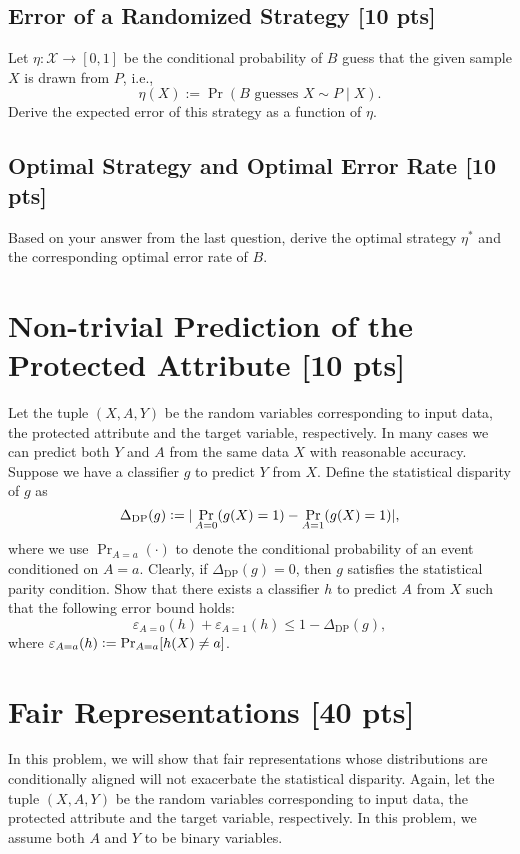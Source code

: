 \documentclass[letterpaper,11pt]{article}
\theoremstyle{definition}
\newcommand{\defeq}{\vcentcolon=}
\begin{document}
	\subsection{Error of a Randomized Strategy [10 pts]}
	Let $\eta:\mathcal{X}\to [0,1]$ be the conditional probability of $B$ guess that the given sample $X$ is drawn from $P$, i.e., 
	\begin{equation*}
		\eta(X) := \Pr(B\text{ guesses }X\sim P\mid X).
	\end{equation*}
	Derive the expected error of this strategy as a function of $\eta$.
	
	\subsection{Optimal Strategy and Optimal Error Rate [10 pts]}
	Based on your answer from the last question, derive the optimal strategy $\eta^*$ and the corresponding optimal error rate of $B$.
	
	\section{Non-trivial Prediction of the Protected Attribute [10 pts]}
	Let the tuple $(X, A, Y)$ be the random variables corresponding to input data, the protected attribute and the target variable, respectively. In many cases we can predict both $Y$ and $A$ from the same data $X$ with reasonable accuracy. Suppose we have a classifier $g$ to predict $Y$ from $X$. Define the statistical disparity of $g$ as
	\begin{equation*}
		\Delta_{\text{DP}}(g)\defeq |\Pr_{A = 0}(g(X) = 1) - \Pr_{A=1}(g(X) = 1)|,
	\end{equation*}
	where we use $\Pr_{A=a}(\cdot)$ to denote the conditional probability of an event conditioned on $A = a$. Clearly, if $\Delta_{\text{DP}}(g) = 0$, then $g$ satisfies the statistical parity condition. Show that there exists a classifier $h$ to predict $A$ from $X$ such that the following error bound holds:
	\begin{equation*}
		\varepsilon_{A = 0}(h) + \varepsilon_{A = 1}(h) \leq 1 - \Delta_{\text{DP}}(g),
	\end{equation*}
	where $\varepsilon_{A = a}(h)\defeq \Pr_{A = a}[h(X)\neq a]$.
	
	\section{Fair Representations [40 pts]}
	In this problem, we will show that fair representations whose distributions are conditionally aligned will not exacerbate the statistical disparity. Again, let the tuple $(X, A, Y)$ be the random variables corresponding to input data, the protected attribute and the target variable, respectively. In this problem, we assume both $A$ and $Y$ to be binary variables.
	
\end{document}
